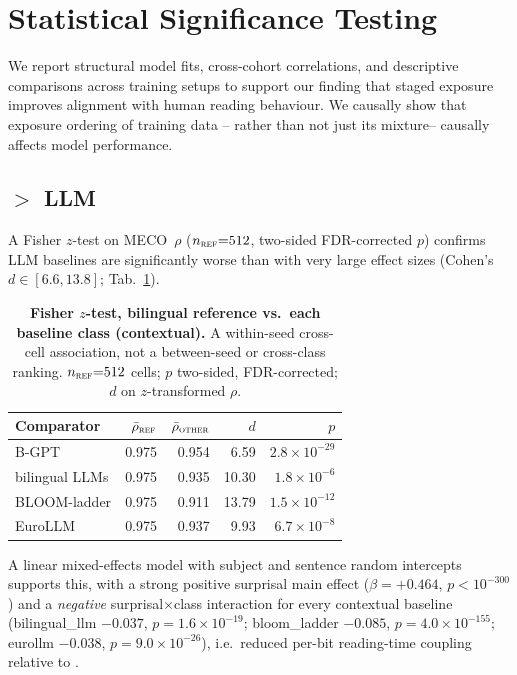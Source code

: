  \newpage 

\section{Statistical Significance Testing} \label{sec:significance-comprehensive}

We report structural model fits, cross-cohort correlations, and descriptive comparisons across training setups to support our finding that staged exposure improves alignment with human reading behaviour. We causally show that exposure ordering of training data – rather than not just its mixture– causally affects model performance. 

\subsection{\beetle{} $>$ LLM}

A Fisher $z$-test on MECO~$\rho$ ($n_\textsc{ref}{=}512$, two-sided FDR-corrected $p$) confirms LLM baselines are significantly worse than \beetle{} with very large effect sizes (Cohen's $d\in[6.6,13.8]$; Tab.~\ref{tab:sig_fisher}).

\begin{table}[!ht]
  \centering \small
  \caption{\textbf{Fisher $z$-test, \beetle{} bilingual reference vs.\ each
  baseline class (contextual).} A within-seed cross-cell association, not a
  between-seed or cross-class ranking. $n_\textsc{ref}{=}512$ cells; $p$
  two-sided, FDR-corrected; $d$ on $z$-transformed $\rho$.}
  \label{tab:sig_fisher}
  \begin{tabular}{lrrrr}
    \toprule
    Comparator & $\bar\rho_\textsc{ref}$ & $\bar\rho_\textsc{other}$ & $d$ & $p$ \\
    \midrule
    B-GPT           & 0.975 & 0.954 & 6.59  & $2.8{\times}10^{-29}$ \\
    bilingual LLMs  & 0.975 & 0.935 & 10.30 & $1.8{\times}10^{-6}$ \\
    BLOOM-ladder    & 0.975 & 0.911 & 13.79 & $1.5{\times}10^{-12}$ \\
    EuroLLM         & 0.975 & 0.937 & 9.93  & $6.7{\times}10^{-8}$ \\
    \bottomrule
  \end{tabular}
\end{table}

A linear mixed-effects model with subject and sentence random intercepts supports this, with a strong positive surprisal main effect ($\beta{=}{+}0.464$, $p{<}10^{-300}$) and a \emph{negative} surprisal$\times$class interaction for every contextual baseline (bilingual\_llm $-0.037$, $p{=}1.6{\times}10^{-19}$; bloom\_ladder $-0.085$, $p{=}4.0{\times}10^{-155}$; eurollm $-0.038$, $p{=}9.0{\times}10^{-26}$), i.e.\ reduced per-bit reading-time coupling relative to \beetle{}. 

